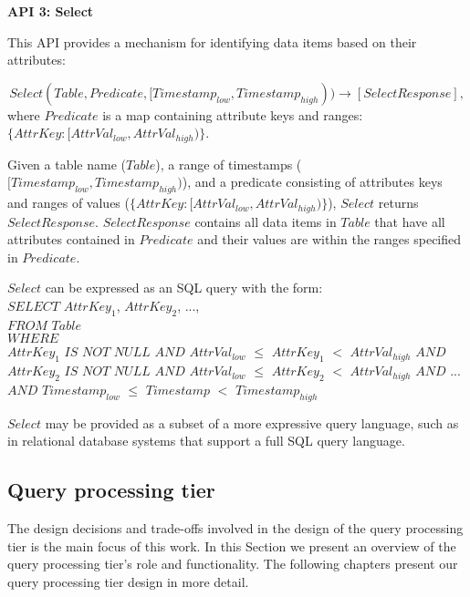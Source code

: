 \bigskip

\noindent
\textbf{API 3: Select}

\noindent
This API provides a mechanism for identifying data items based on their attributes:

\begin{sloppypar}
\[
  Select(Table, Predicate, [Timestamp_{low}, Timestamp_{high})) \rightarrow [SelectResponse],
\]
where $Predicate$ is a map containing attribute keys and ranges:
$\{AttrKey: [AttrVal_{low}, AttrVal_{high})\}$.
\end{sloppypar}

\begin{sloppypar}
Given a table name ($Table$), a range of timestamps ($[Timestamp_{low}, Timestamp_{high})$), and
a predicate consisting of attributes keys and ranges of values
($\{AttrKey: [AttrVal_{low}, AttrVal_{high})\}$), $Select$ returns $SelectResponse$.
$SelectResponse$ contains all data items in $Table$ that have all attributes contained in $Predicate$ and
their values are within the ranges specified in $Predicate$.
\end{sloppypar}

$Select$ can be expressed as an SQL query with the form: \\
\noindent
$SELECT$ $AttrKey_1$, $AttrKey_2$, ..., \\
$FROM$ $Table$ \\
$WHERE$ \\
$AttrKey_1$ $IS$ $NOT$ $NULL$ $AND$ $AttrVal_{low}$ $\leq$ $AttrKey_1$ $<$ $AttrVal_{high}$
$AND$ $AttrKey_2$ $IS$ $NOT$ $NULL$ $AND$ $AttrVal_{low}$ $\leq$ $AttrKey_2$ $<$ $AttrVal_{high}$
$AND$ ... \\
$AND$ $Timestamp_{low}$ $\leq$ $Timestamp$ $<$ $Timestamp_{high}$

$Select$ may be provided as a subset of a more expressive query language, such as in relational database
systems that support a full SQL query language. \\

\subsection{Query processing tier}
\label{subsec:query_prcessing_tier}
The design decisions and trade-offs involved in the design of the query processing tier is the main focus of this work.
In this Section we present an overview of the query processing tier's role and functionality.
The following chapters present our query processing tier design in more detail.

